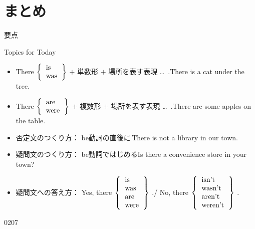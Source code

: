 \documentclass[aspectratio=169,xcolor={dvipsnames,table}]{beamer}
\newcommand{\myaudio}[1]{\href{#1}{\faVolumeUp}}
\begin{document}
\section{まとめ}
\begin{frame}[plain]{要点}

\begin{exampleblock}{Topics for Today}
 \begin{itemize}[square]\small
 \item There $\left\{
              \begin{tabular}{l}
              {is}\\
              {was}
              \end{tabular}
\right\}$ $+$ 単数形 $+$ 場所を表す表現 \ldots\,\,\,.\hfill{\scriptsize There is a cat under the tree.}
 \item There $\left\{
              \begin{tabular}{l}
              {are}\\
              {were}
              \end{tabular}
\right\}$ $+$ 複数形 $+$ 場所を表す表現 \ldots\,\,\,.\hfill{\scriptsize There are some apples on the table.}
 \item 否定文のつくり方： be動詞の直後に\,\hfill{}{\scriptsize There is not a library in our town.}
  \item 疑問文のつくり方： be動詞ではじめる\hfill{}{\scriptsize Is there a convenience store in your town?}
  \item 疑問文への答え方： Yes, there $\left\{
              \begin{tabular}{l}
              is\\
              was\\
              {are}\\
              {were}
              \end{tabular}
\right\}$ .\hfill{}/\hfill
No, there $\left\{
              \begin{tabular}{l}
              isn't\\
              wasn't\\
              {aren't}\\
              {weren't}
              \end{tabular}
\right\}$ .\hfill{}\mbox{}
\end{itemize}
\end{exampleblock}
\hfill{\tiny 0207}\,{\scriptsize \myaudio{./audio/001_there_is_14.mp3}}
\end{frame}
\end{document}
